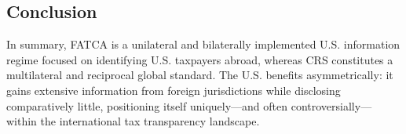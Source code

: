 \documentclass[12pt]{article}
\begin{document}
\subsection{Conclusion}
In summary, FATCA is a unilateral and bilaterally implemented U.S. information regime focused on identifying U.S. taxpayers abroad, whereas CRS constitutes a multilateral and reciprocal global standard. The U.S. benefits asymmetrically: it gains extensive information from foreign jurisdictions while disclosing comparatively little, positioning itself uniquely—and often controversially—within the international tax transparency landscape.





\newpage
\printbibliography
\end{document}
